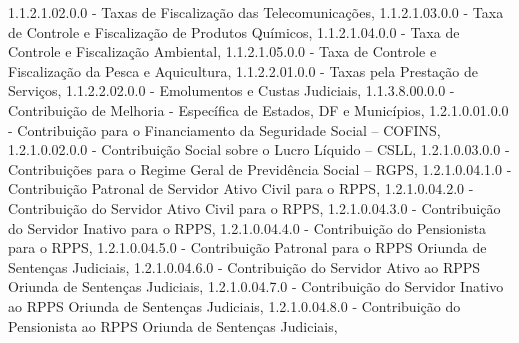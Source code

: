 \documentclass[
  12,
  dvipsnames]{article}
\newenvironment{Shaded}{\begin{snugshade}}{\end{snugshade}}
\newcommand{\NormalTok}[1]{#1}
\newcommand{\StringTok}[1]{\textcolor[rgb]{0.31,0.60,0.02}{#1}}
\begin{document}
\begin{Shaded}
\begin{Highlighting}[]
            \StringTok{\textquotesingle{}1.1.2.1.02.0.0 {-} Taxas de Fiscalização das Telecomunicações\textquotesingle{}}\NormalTok{,}
            \StringTok{\textquotesingle{}1.1.2.1.03.0.0 {-} Taxa de Controle e Fiscalização de Produtos Químicos\textquotesingle{}}\NormalTok{,}
            \StringTok{\textquotesingle{}1.1.2.1.04.0.0 {-} Taxa de Controle e Fiscalização Ambiental\textquotesingle{}}\NormalTok{,}
            \StringTok{\textquotesingle{}1.1.2.1.05.0.0 {-} Taxa de Controle e Fiscalização da Pesca e Aquicultura\textquotesingle{}}\NormalTok{,}
            \StringTok{\textquotesingle{}1.1.2.2.01.0.0 {-} Taxas pela Prestação de Serviços\textquotesingle{}}\NormalTok{,}
            \StringTok{\textquotesingle{}1.1.2.2.02.0.0 {-} Emolumentos e Custas Judiciais\textquotesingle{}}\NormalTok{,}
            \StringTok{\textquotesingle{}1.1.3.8.00.0.0 {-} Contribuição de Melhoria {-} Específica de Estados, DF e Municípios\textquotesingle{}}\NormalTok{,}
            \StringTok{\textquotesingle{}1.2.1.0.01.0.0 {-} Contribuição para o Financiamento da Seguridade Social – COFINS\textquotesingle{}}\NormalTok{,}
            \StringTok{\textquotesingle{}1.2.1.0.02.0.0 {-} Contribuição Social sobre o Lucro Líquido – CSLL\textquotesingle{}}\NormalTok{,}
            \StringTok{\textquotesingle{}1.2.1.0.03.0.0 {-} Contribuições para o Regime Geral de Previdência Social – RGPS\textquotesingle{}}\NormalTok{,}
            \StringTok{\textquotesingle{}1.2.1.0.04.1.0 {-} Contribuição Patronal de Servidor Ativo Civil para o RPPS\textquotesingle{}}\NormalTok{,}
            \StringTok{\textquotesingle{}1.2.1.0.04.2.0 {-} Contribuição do Servidor Ativo Civil para o RPPS\textquotesingle{}}\NormalTok{,}
            \StringTok{\textquotesingle{}1.2.1.0.04.3.0 {-} Contribuição do Servidor Inativo para o RPPS\textquotesingle{}}\NormalTok{,}
            \StringTok{\textquotesingle{}1.2.1.0.04.4.0 {-} Contribuição do Pensionista para o RPPS\textquotesingle{}}\NormalTok{,}
            \StringTok{\textquotesingle{}1.2.1.0.04.5.0 {-} Contribuição Patronal para o RPPS Oriunda de Sentenças Judiciais\textquotesingle{}}\NormalTok{,}
            \StringTok{\textquotesingle{}1.2.1.0.04.6.0 {-} Contribuição do Servidor Ativo ao RPPS Oriunda de Sentenças Judiciais\textquotesingle{}}\NormalTok{,}
            \StringTok{\textquotesingle{}1.2.1.0.04.7.0 {-} Contribuição do Servidor Inativo ao RPPS Oriunda de Sentenças Judiciais\textquotesingle{}}\NormalTok{,}
            \StringTok{\textquotesingle{}1.2.1.0.04.8.0 {-} Contribuição do Pensionista ao RPPS Oriunda de Sentenças Judiciais\textquotesingle{}}\NormalTok{,}

\end{Highlighting}
\end{Shaded}
\end{document}
